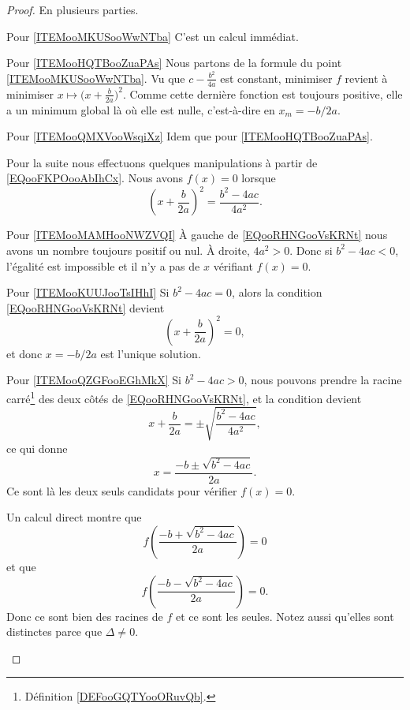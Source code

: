 \begin{proof}
    En plusieurs parties.
    \begin{subproof}
    \item[Pour \ref{ITEMooMKUSooWwNTba}]
        C'est un calcul immédiat.
    \item[Pour \ref{ITEMooHQTBooZuaPAs}]
        Nous partons de la formule du point \ref{ITEMooMKUSooWwNTba}. Vu que \( c-\frac{ b^2 }{ 4a }\) est constant, minimiser \( f\) revient à minimiser \( x\mapsto \big( x+\frac{ b }{ 2a } \big)^2\). Comme cette dernière fonction est toujours positive, elle a un minimum global là où elle est nulle, c'est-à-dire en \( x_m=-b/2a\).
    \item[Pour \ref{ITEMooQMXVooWsqiXz}]
        Idem que pour \ref{ITEMooHQTBooZuaPAs}.
    \end{subproof}
    Pour la suite nous effectuons quelques manipulations à partir de \eqref{EQooFKPOooAbIhCx}. Nous avons \( f(x)=0\) lorsque
    \begin{equation}        \label{EQooRHNGooVsKRNt}
        (x+\frac{ b }{ 2a })^2=\frac{ b^2-4ac }{ 4a^2 }.
    \end{equation}
    \begin{subproof}
    \item[Pour \ref{ITEMooMAMHooNWZVQI}]
        À gauche de \eqref{EQooRHNGooVsKRNt} nous avons un nombre toujours positif ou nul. À droite, \( 4a^2>0\). Donc si \( b^2-4ac<0\), l'égalité est impossible et il n'y a pas de \( x\) vérifiant \( f(x)=0\).
    \item[Pour \ref{ITEMooKUUJooTsIHhI}]
        Si \( b^2-4ac=0\), alors la condition \eqref{EQooRHNGooVsKRNt} devient
        \begin{equation}
            \left( x+\frac{ b }{ 2a } \right)^2=0,
        \end{equation}
        et donc \( x=-b/2a\) est l'unique solution.
    \item[Pour \ref{ITEMooQZGFooEGhMkX}]
        Si \( b^2-4ac>0\), nous pouvons prendre la racine carré\footnote{Définition \ref{DEFooGQTYooORuvQb}.} des deux côtés de \eqref{EQooRHNGooVsKRNt}, et la condition devient
        \begin{equation}
            x+\frac{ b }{ 2a }=\pm\sqrt{ \frac{ b^2-4ac }{ 4a^2 } }, 
        \end{equation}
        ce qui donne
        \begin{equation}
            x=\frac{ -b\pm\sqrt{ b^2-4ac } }{ 2a }.
        \end{equation}
        Ce sont là les deux seuls candidats pour vérifier \( f(x)=0\). 

        Un calcul direct montre que
        \begin{equation}
            f\left( \frac{ -b+\sqrt{ b^2-4ac } }{ 2a } \right)=0
        \end{equation}
        et que
        \begin{equation}
            f\left( \frac{ -b-\sqrt{ b^2-4ac } }{ 2a } \right)=0.
        \end{equation}
        Donc ce sont bien des racines de \( f\) et ce sont les seules. Notez aussi qu'elles sont distinctes parce que \( \Delta\neq 0\).
    \end{subproof}
\end{proof}
